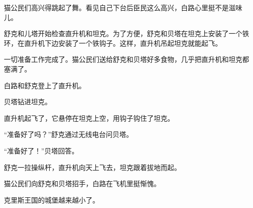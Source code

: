 \documentclass[a4paper,12pt,UTF8,twoside]{ctexbook}
\begin{document}
猫公民们高兴得跳起了舞。看见自己下台后臣民这么高兴，白路心里挺不是滋味儿。

舒克和儿塔开始检查直升机和坦克。为了方便，舒克和贝塔在坦克上安装了一个铁环，在直升机下边安装了一个铁钩子。这样，直升机吊起坦克就能起飞。

一切准备工作完成了。猫公民们送给舒克和贝塔好多食物，几乎把直升机和坦克都塞满了。

白路和舒克登上了直升机。

贝塔钻进坦克。

直升机起飞了，它悬停在坦克上空，用钩子钩住了坦克。

“准备好了吗？”舒克通过无线电台问贝塔。

“准备好了！”贝塔回答。

舒克一拉操纵杆，直升机向天上飞去，坦克跟着拔地而起。

猫公民们向舒克和贝塔招手，白路在飞机里挺惭愧。

克里斯王国的城堡越来越小了。
\end{document}
